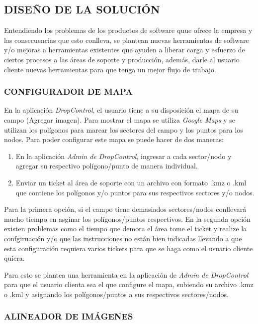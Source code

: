 
\subsection{DISEÑO DE LA SOLUCIÓN}

Entendiendo los problemas de los productos de software quue ofrece la empresa y las consecuencias que esto conlleva,
se plantean nuevas herramientas de software y/o mejoras a herramientas existentes que ayuden a liberar carga y esfuerzo
de ciertos procesos a las áreas de soporte y producción, además, darle al usuario cliente nuevas herramientas para que tenga un mejor flujo de trabajo.

\subsubsection{CONFIGURADOR DE MAPA}

En la aplicación \textit{DropControl}, el usuario tiene a su disposición el mapa de su campo (Agregar imagen). 
Para mostrar el mapa se utiliza \textit{Google Maps} y se utilizan los polígonos para marcar los sectores del campo y los puntos para los nodos.
Para poder configurar este mapa se puede hacer de dos maneras:
\begin{enumerate}
    \item En la aplicación \textit{Admin de DropControl}, ingresar a cada sector/nodo y agregar su respectivo polígono/punto de manera individual.
    \item Enviar un ticket al área de soporte con un archivo con formato .kmz o .kml que contiene los polígonos y/o puntos para sus respectivos sectores y/o nodos.
\end{enumerate}
Para la primera opción, si el campo tiene demasiados sectores/nodos conllevará mucho tiempo en asginar los polígonos/puntos respectivos.
En la segunda opción existen problemas como el tiempo que demora el área tome el ticket y realize la confgiruación y/o 
que las instrucciones no están bien indicadas llevando a que esta configuración requiera varios tickets para que se haga como el usuario cliente quiera.

Para esto se plantea una herramienta en la aplicación de \textit{Admin de DropControl} para que el usuario clienta sea el que
configure el mapa, subiendo su archivo .kmz o .kml y asignando los polígonos/puntos a sus respectivos sectores/nodos.

\subsubsection{ALINEADOR DE IMÁGENES}

